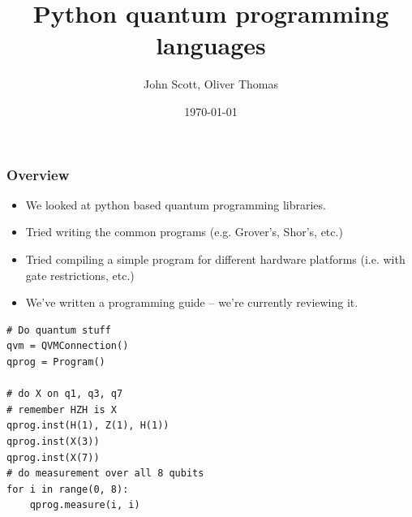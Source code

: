\documentclass{beamer}
\title{Python quantum programming languages}
\author{John Scott, Oliver Thomas}
\institute{Quantum Engineering CDT \\ University of Bristol}
\date{\today}
\begin{document}
\frame{\titlepage}

\begin{frame}[fragile]
\frametitle{Overview}
\begin{minipage}{0.52\textwidth}
\begin{itemize}
    \item We looked at python based quantum programming libraries.
    \item Tried writing the common programs (e.g. Grover's, Shor's, etc.)
    \item Tried compiling a simple program for different hardware platforms (i.e. with gate restrictions, etc.)
    \item We've written a programming guide -- we're currently reviewing it.
\end{itemize}
\end{minipage} \hfill
%
\begin{minipage}{0.44\textwidth}
 \begin{verbatim}
# Do quantum stuff  
qvm = QVMConnection() 
qprog = Program() 

# do X on q1, q3, q7 
# remember HZH is X 
qprog.inst(H(1), Z(1), H(1)) 
qprog.inst(X(3)) 
qprog.inst(X(7)) 
# do measurement over all 8 qubits 
for i in range(0, 8): 
    qprog.measure(i, i) 
  \end{verbatim}
  \end{minipage}
\end{frame}
\end{document}
